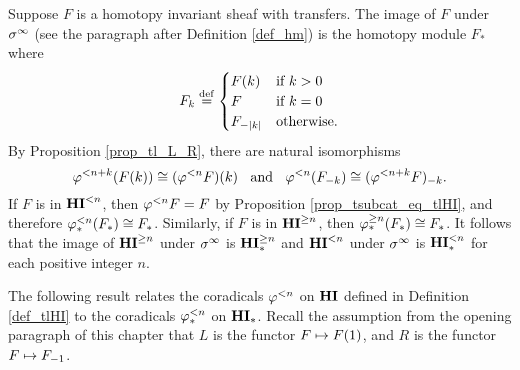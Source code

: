 \begin{ex}\label{ex_TFHI_eq_TFHM}
Suppose $F$ is a homotopy invariant sheaf with transfers. The
image of $F$ under $\spectHI$ (see the paragraph after
Definition \ref{def_hm}) is the homotopy module $F_*$ where
\[
F_k \defeq \begin{cases}
\LHI[k]{F} & \textrm{if }k > 0\\
F &\textrm{if }k = 0\\
\RHI[|k|]{F} &\textrm{otherwise}.
\end{cases}
\]
By Proposition \ref{prop_tl_L_R}, there are natural isomorphisms 
\[
\tlHI{n + k}(\LHI[k]{F}) \cong \LHI[k]{(\tlHI{n}F)} \;\;\textrm{ and }\;\; 
\tlHI{n}(\RHI[k]{F}) \cong \RHI[k]{(\tlHI{n + k}F)}.
\]
If $F$ is in $\TFHI{n}$, then $\tlHI{n}F 
= F$ by Proposition \ref{prop_tsubcat_eq_tlHI}, and therefore
$\tlHM{n}(F_*) \cong F_*$. Similarly, if $F$ is in $\THI{n}$,
then $\tgHM{n}(F_*) \cong F_*$. It follows that the image of
$\THI{n}$ under $\spectHI$ is $\THM{n}$ and $\TFHI{n}$ under
$\spectHI$ is $\TFHM{n}$ for each positive integer $n$.
\end{ex}

The following result relates the coradicals $\tlHI{n}$ on $\HI$ 
defined in Definition \ref{def_tlHI} to the coradicals $\tlHM{n}$ 
on $\HM$. Recall the assumption from the opening paragraph of this
chapter that $L$ is the functor $F \mapsto \LHI{F}$, and $R$ is
the functor $F \mapsto \RHI{F}$.

